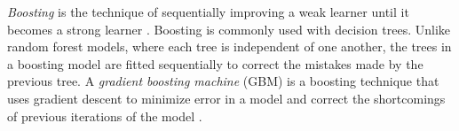 \documentclass{article}
\begin{document}

	\textit{Boosting} is the technique of sequentially improving a weak learner until it becomes a strong learner \cite{schapire1990strength}. Boosting is commonly used with decision trees. Unlike random forest models, where each tree is independent of one another, the trees in a boosting model are fitted sequentially to correct the mistakes made by the previous tree. A \textit{gradient boosting machine} (GBM) is a boosting technique that uses gradient descent to minimize error in a model and correct the shortcomings of previous iterations of the model \cite{friedman2001greedy}. 
	
\end{document}
